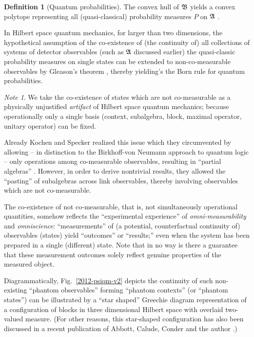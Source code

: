 \documentclass[%
  preprint,
 showpacs,
 showkeys,
 preprintnumbers,
 amsmath,amssymb,
 aps,
 prl,
  longbibliography,
 ]{revtex4-1}
\theoremstyle{definition}
\newtheorem{definition}{Definition}
\theoremstyle{remark}
\newtheorem*{note}{Note}
\begin{document}
\begin{definition}[Quantum probabilities]
The convex hull \cite{Henk-Ziegler-polytopes} of ${\frak B}$
yields a convex polytope
representing all (quasi-classical) probability measures $P$ on
${\frak A}$
\cite{Boole-62,pitowsky}.

In Hilbert space quantum mechanics,
for larger than two dimensions,
the hypothetical assumption of the co-existence
of (the continuity of) all collections of systems of detector observables (such as ${\frak A}$ discussed earlier)
the quasi-classic probability measures on single states can be extended to
non-co-measurable observables by Gleason's theorem \cite{r:dvur-93},
thereby yielding's the Born rule for quantum probabilities.
\end{definition}


\begin{note}
We take the co-existence of states which are not co-measurable as a physically unjustified {\it artifact} of Hilbert space quantum mechanics;
because operationally only a single basis (context, subalgebra, block, maximal operator, unitary operator)
can be fixed.

Already Kochen and Specker realized this issue which they circumvented by allowing -- in distinction to the Birkhoff-von Neumann approach to quantum logic
\cite{birkhoff-36,bell-cas,pulmannova-91} --
 only operations among co-measurable observables,
resulting in ``partial algebras'' \cite{kochen3}.
However, in order to derive nontrivial results, they allowed the ``pasting'' of subalgebras across link observables,
thereby involving observables which are not co-measurable.

The co-existence of not co-measurable, that is, not simultaneously operational quantities, somehow reflects the ``experimental experience'' of
{\em omni-measurability} and {\em omniscience}:
``measurements'' of (a potential, counterfactual continuity of) observables (states) yield ``outcomes'' or ``results;'' even when the system has been prepared in a single (different) state.
Note that in no way is there a guarantee that these measurement outcomes solely reflect genuine properties of the measured object.

Diagrammatically, Fig.~\ref{2012-psiqm-v2} depicts the continuity of such non-existing ``phantom observables'' forming  ``phantom contexts'' (or ``phantom states'') can be illustrated by a
``star shaped'' Greechie diagram representation of a configuration of blocks in three dimensional Hilbert space
with overlaid two-valued measure. (For other reasons, this star-shaped configuration has also been
discussed in a recent publication of
Abbott, Calude, Conder and the author \cite[Fig.~2]{2012-incomput-proofsCJ}.)
\end{note}
\end{document}
